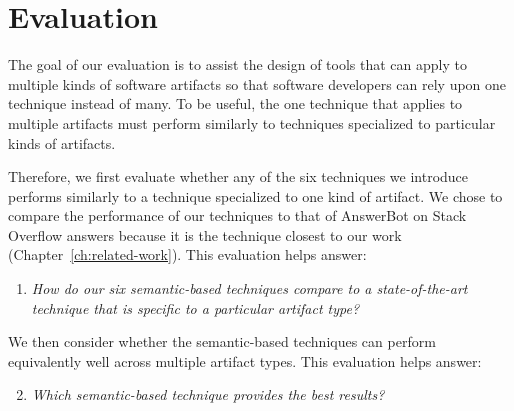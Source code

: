 
\section{Evaluation}
\label{cp5:evaluation}



The goal of our evaluation is to assist the design of tools that
can apply to multiple kinds of software artifacts
so that software developers can rely upon
one technique instead of many. To be useful, the one technique
that applies to multiple artifacts must 
perform similarly to techniques specialized
to particular kinds of artifacts.


Therefore, we first evaluate whether any of the
six techniques we introduce performs
similarly to a technique specialized to one
kind of artifact. We chose to compare
the performance of our techniques to
that of AnswerBot on Stack Overflow
answers because it is the technique closest to our work (Chapter~\ref{ch:related-work}). This
evaluation helps answer: 

\newpage

\begin{enumerate}[label=\textit{RQ\arabic*},leftmargin=*]

    \item  \textit{How do our six semantic-based techniques compare to a state-of-the-art technique that is specific to a particular artifact type?} 

\end{enumerate}







We then consider whether the semantic-based
techniques can perform equivalently well across
multiple artifact types.
This evaluation helps answer:




\begin{enumerate}[label=\textit{RQ\arabic*},leftmargin=*]
    \setcounter{enumi}{1}

    \item  \textit{Which semantic-based technique provides the best results?} 

\end{enumerate}

